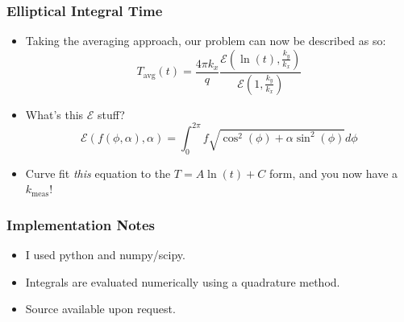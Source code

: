 \documentclass{beamer}
\begin{document}
\begin{frame}
\frametitle{Elliptical Integral Time}
\begin{itemize}
\item Taking the averaging approach, our problem can now be described as so:
\begin{equation*}
T_{\textrm{avg}}(t) = \frac{4\pi k_x}{q} \frac{\mathcal{E}(\ln(t), \frac{k_y}{k_x})}{\mathcal{E}(1, \frac{k_y}{k_x})}
\end{equation*}

\item What's this \(\mathcal{E}\) stuff?
\begin{equation*}
\mathcal{E}(f(\phi, \alpha), \alpha) = \int_0^{2\pi} f\sqrt{\cos^2(\phi) + \alpha\sin^2(\phi)} d\phi
\end{equation*}
\item Curve fit \emph{this} equation to the \(T = A \ln(t) + C\) form, and you now
have a \(k_{\textrm{meas}}\)!
\end{itemize}
\end{frame}


\begin{frame}
\frametitle{Implementation Notes}
\begin{itemize}
\item I used python and numpy/scipy.
\item Integrals are evaluated numerically using a quadrature method.
\item Source available upon request.
\end{itemize}
\end{frame}
\end{document}
